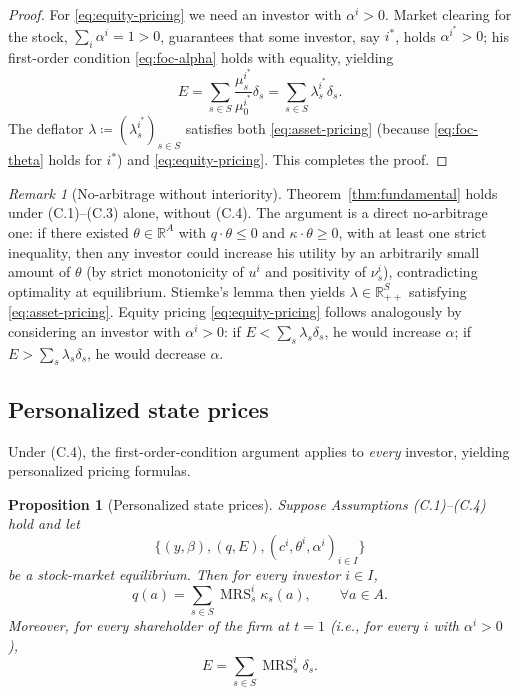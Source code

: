 \documentclass[11pt,a4paper,oneside]{book}
\def\R{\mathbb{R}}
\def\leq{\leqslant}
\def\geq{\geqslant}
\DeclareMathOperator{\MRS}{MRS}
\theoremstyle{plain}
\newtheorem{proposition}[theorem]{Proposition}
\theoremstyle{definition}
\theoremstyle{remark}
\newtheorem{remark}[theorem]{Remark}
\numberwithin{equation}{chapter}
\begin{document}
\begin{proof}
For \eqref{eq:equity-pricing} we need an investor with $\alpha^i > 0$.
Market clearing for the stock, $\sum_i \alpha^i = 1 > 0$, guarantees that some investor, say $i^\ast$, holds $\alpha^{i^\ast} > 0$; his first-order condition \eqref{eq:foc-alpha} holds with equality, yielding
\begin{equation*}
  E = \sum_{s \in S} \frac{\mu^{i^\ast}_s}{\mu^{i^\ast}_0} \delta_s = \sum_{s \in S} \lambda^{i^\ast}_s \delta_s.
\end{equation*}
The deflator $\lambda \coloneqq (\lambda^{i^\ast}_s)_{s \in S}$ satisfies both \eqref{eq:asset-pricing} (because \eqref{eq:foc-theta} holds for $i^\ast$) and \eqref{eq:equity-pricing}.
This completes the proof.
\end{proof}

\begin{remark}[No-arbitrage without interiority]\label{rem:no-arbitrage}
Theorem~\ref{thm:fundamental} holds under (C.1)--(C.3) alone, without (C.4).
The argument is a direct no-arbitrage one: if there existed $\theta \in \R^A$ with $q \cdot \theta \leq 0$ and $\kappa \cdot \theta \geq 0$, with at least one strict inequality, then any investor could increase his utility by an arbitrarily small amount of $\theta$ (by strict monotonicity of $u^i$ and positivity of $\nu^i_s$), contradicting optimality at equilibrium.
Stiemke's lemma then yields $\lambda \in \R_{++}^S$ satisfying \eqref{eq:asset-pricing}.
Equity pricing \eqref{eq:equity-pricing} follows analogously by considering an investor with $\alpha^i > 0$: if $E < \sum_s \lambda_s \delta_s$, he would increase $\alpha$; if $E > \sum_s \lambda_s \delta_s$, he would decrease $\alpha$.
\end{remark}

\subsection{Personalized state prices}

Under (C.4), the first-order-condition argument applies to \emph{every} investor, yielding personalized pricing formulas.

\begin{proposition}[Personalized state prices]\label{prop:personalized}
Suppose Assumptions \textup{(C.1)--(C.4)} hold and let
\begin{equation*}
  \bigl\{ (y, \beta), (q, E), (c^i, \theta^i, \alpha^i)_{i \in I} \bigr\}
\end{equation*}
be a stock-market equilibrium.
Then for every investor $i \in I$,
\begin{equation}\label{eq:personalized-q}
  q(a) = \sum_{s \in S} \MRS^i_s \kappa_s(a), \qquad \forall a \in A.
\end{equation}
Moreover, for every shareholder of the firm at $t=1$ (i.e., for every $i$ with $\alpha^i > 0$),
\begin{equation}\label{eq:personalized-E}
  E = \sum_{s \in S} \MRS^i_s \delta_s.
\end{equation}
\end{proposition}
\end{document}
